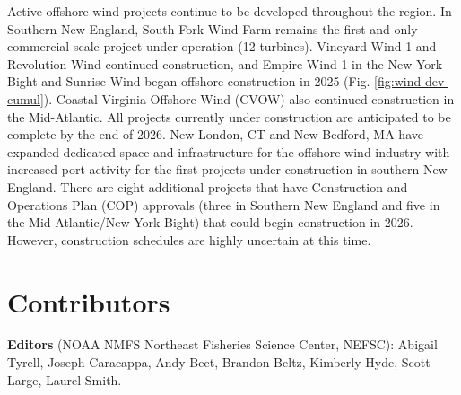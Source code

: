 \documentclass[
  10pt,
]{article}
\begin{document}
Active offshore wind projects continue to be developed throughout the region. In Southern New England, South Fork Wind Farm remains the first and only commercial scale project under operation (12 turbines). Vineyard Wind 1 and Revolution Wind continued construction, and Empire Wind 1 in the New York Bight and Sunrise Wind began offshore construction in 2025 (Fig. \ref{fig:wind-dev-cumul}). Coastal Virginia Offshore Wind (CVOW) also continued construction in the Mid-Atlantic. All projects currently under construction are anticipated to be complete by the end of 2026. New London, CT and New Bedford, MA have expanded dedicated space and infrastructure for the offshore wind industry with increased port activity for the first projects under construction in southern New England. There are eight additional projects that have Construction and Operations Plan (COP) approvals (three in Southern New England and five in the Mid-Atlantic/New York Bight) that could begin construction in 2026. However, construction schedules are highly uncertain at this time.

\section{Contributors}\label{contributors}

\textbf{Editors} (NOAA NMFS Northeast Fisheries Science Center, NEFSC): Abigail Tyrell, Joseph Caracappa, Andy Beet, Brandon Beltz, Kimberly Hyde, Scott Large, Laurel Smith.
\end{document}
